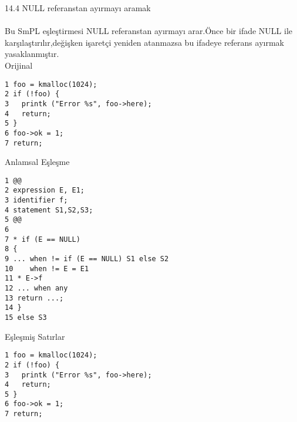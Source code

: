 \documentclass[22pt]{article}
\begin{document}
14.4 NULL referanstan ayırmayı aramak\\
\\
Bu SmPL eşleştirmesi NULL referanstan ayırmayı arar.Önce bir ifade NULL ile karşılaştırılır,değişken işaretçi yeniden atanmazsa bu ifadeye referans ayırmak yasaklanmıştır.
\\		
		  Orijinal\\
\begin{lstlisting}
1 foo = kmalloc(1024);
2 if (!foo) {
3   printk ("Error %s", foo->here);
4   return;
5 }
6 foo->ok = 1;
7 return;
\end{lstlisting}
		Anlamsal Eşleşme\\
\begin{lstlisting}
1 @@
2 expression E, E1;
3 identifier f;
4 statement S1,S2,S3;
5 @@
6
7 * if (E == NULL)
8 {
9 ... when != if (E == NULL) S1 else S2
10    when != E = E1
11 * E->f
12 ... when any
13 return ...;
14 }
15 else S3
\end{lstlisting}
	      Eşleşmiş Satırlar\\
\begin{lstlisting}
1 foo = kmalloc(1024);
2 if (!foo) {
3   printk ("Error %s", foo->here);
4   return;
5 }
6 foo->ok = 1;
7 return;
\end{lstlisting}
\end{document}
